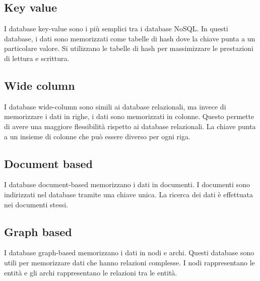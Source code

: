\subsection{Key value}
I database key-value sono i più semplici tra i database NoSQL. In questi
database, i dati sono memorizzati come tabelle di hash dove la chiave punta a un
particolare valore. Si utilizzano le tabelle di hash per massimizzare le prestazioni
di lettura e scrittura.
\subsection{Wide column}
I database wide-column sono simili ai database relazionali, ma invece di
memorizzare i dati in righe, i dati sono memorizzati in colonne. Questo permette
di avere una maggiore flessibilità rispetto ai database relazionali. La chiave
punta a un insieme di colonne che può essere diverso per ogni riga.
\subsection{Document based}
I database document-based memorizzano i dati in documenti. I documenti sono
indirizzati nel database tramite una chiave unica. La ricerca dei dati è
effettuata nei documenti stessi.
\subsection{Graph based}
I database graph-based memorizzano i dati in nodi e archi. Questi database sono
utili per memorizzare dati che hanno relazioni complesse. I nodi rappresentano
le entità e gli archi rappresentano le relazioni tra le entità.

